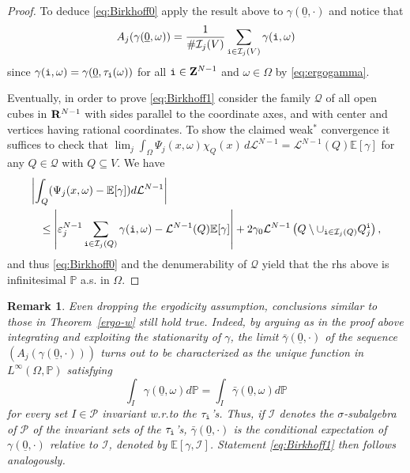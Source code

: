 \documentclass[10pt,reqno]{amsart}
\numberwithin{equation}{section}
\def\L{{\mathcal L}}
\def\R{{\bf R}}
\def\Z{{\bf Z}}
\def\eps{{\varepsilon}_j}
\def\epsN{\eps^{N-1}}
\def\ii{{\tt i}}
\def\Om{\Omega}
\def\om{\omega}
\def\Qijo{Q_j^\ii}
\def\gammaio{\gamma(\ii,\om)}
\def\Ieps{{\mathcal I}_j}
\def\gammab{\gamma_0}
\def\mmu{\mathbb{P}}
\def\LN{\L^{N-1}}
\newtheorem{remark}[theorem]{Remark}
\begin{document}
\begin{proof}
To deduce \eqref{eq:Birkhoff0} apply the result above to
$\gamma(\underline{0},\cdot)$ and notice that
$$
A_j(\gamma(\underline{0},\om))=
\frac{1}{\#\Ieps(V)}\sum_{\ii\in\Ieps(V)}\gamma(\ii,\om)
$$
since $\gammaio=\gamma(\underline{0},\tau_{\ii}(\om))$
for all $\ii\in\Z^{N-1}$ and $\om\in\Om$ by \eqref{eq:ergogamma}.

Eventually, in order to prove \eqref{eq:Birkhoff1}
consider the family $\mathscr{Q}$ of all open cubes in $\R^{N-1}$
with sides parallel to the coordinate axes, and with center and vertices
having rational coordinates.
To show the claimed weak$^\ast$ convergence it suffices to check that
$\lim_j\int_\Om\Psi_j(x,\om)\chi_Q(x)\,d\LN=\LN(Q)\mathbb{E}[\gamma]$
for any $Q\in\mathscr{Q}$ with $Q\subseteq V$.
We have
\begin{eqnarray*}
\lefteqn{\left|\int_{Q}(\Psi_j(x,\om)-
\mathbb{E}[\gamma])d\LN\right|}\\&&
\leq\left|\epsN\sum_{\ii\in\Ieps(Q)}\gammaio
-\LN(Q)\mathbb{E}[\gamma]\right|+2\gammab
\LN\left(Q\setminus\cup_{\ii\in\Ieps(Q)}\Qijo\right),
\end{eqnarray*}
and thus \eqref{eq:Birkhoff0} and the denumerability of $\mathscr{Q}$
yield that the rhs above is infinitesimal $\mmu$ a.s. in $\Om$.
\end{proof}

\begin{remark}\label{only-stationary}
Even dropping the ergodicity assumption, 
conclusions similar to %
those in Theorem~\ref{ergo-w} still hold true. 
Indeed, by arguing as in the proof above integrating and  
exploiting the stationarity of $\gamma$, the limit 
$\bar{\gamma}(\underline{0},\cdot)$ of the sequence 
$(A_j(\gamma(\underline{0},\cdot)))$ turns out 
to be characterized as the unique %
function in $L^\infty(\Om,\mmu)$ satisfying 
$$
\int_I\gamma(\underline{0},\om)d\mmu=
\int_I\bar{\gamma}(\underline{0},\om)d\mmu
$$
for every set $I\in\mathscr{P}$ invariant w.r.to the
$\tau_\ii$'s. Thus, if 
$\mathscr{I}$ denotes the $\sigma$-subalgebra  of $\mathscr{P}$ 
of the invariant sets of the $\tau_\ii$'s, 
$\bar{\gamma}(\underline{0},\cdot)$ is 
the conditional expectation of $\gamma(\underline{0},\cdot)$
relative to $\mathscr{I}$, denoted by $\mathbb{E}[\gamma,\mathscr{I}]$.
Statement \eqref{eq:Birkhoff1} then follows analogously. 

\end{remark}
\end{document}
